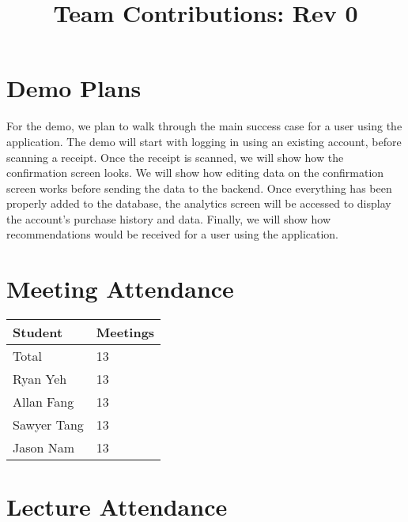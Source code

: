 \documentclass{article}
\title{Team Contributions: Rev 0\\\progname}
\author{\authname}
\date{}
\begin{document}
\maketitle

\section{Demo Plans}

For the demo, we plan to walk through the main success case for a user using the application.
The demo will start with logging in using an existing account, before scanning a receipt. Once
the receipt is scanned, we will show how the confirmation screen looks. We will show how editing
data on the confirmation screen works before sending the data to the backend. Once everything has
been properly added to the database, the analytics screen will be accessed to display the account's
purchase history and data. Finally, we will show how recommendations would be received for a user
using the application.

\section{Meeting Attendance}


\begin{table}[H]
\centering
\begin{tabular}{ll}
\toprule
\textbf{Student} & \textbf{Meetings}\\
\midrule
Total & 13\\
Ryan Yeh & 13\\
Allan Fang & 13\\
Sawyer Tang & 13\\
Jason Nam & 13\\
\bottomrule
\end{tabular}
\end{table}


\section{Lecture Attendance}
\end{document}
